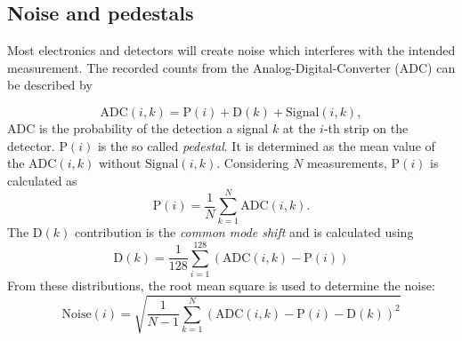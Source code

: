 \subsection{Noise and pedestals}
Most electronics and detectors will create noise which interferes with the intended measurement. The recorded counts from the Analog-Digital-Converter (ADC) can be described by

\begin{equation*}
	\mathrm{ADC}(i,k) = \mathrm{P}(i) + \mathrm{D}(k) + \mathrm{Signal}(i,k),
\end{equation*}
ADC is the probability of the detection a signal $k$ at the $i$-th strip on the detector. $\mathrm{P}(i)$ is the so called \textit{pedestal}. It is determined as the mean value of the $\mathrm{ADC}(i,k)$ without $\mathrm{Signal}(i,k)$. Considering $N$ measurements, $\mathrm{P}(i)$ is calculated as
\begin{equation}
	\mathrm{P}(i) = \frac{1}{N} \sum_{k=1}^{N}\mathrm{ADC}(i,k).
	\label{eq:pedestal}
\end{equation}
The $\mathrm{D}(k)$ contribution is the \textit{common mode shift} and is calculated using 
\begin{equation}
	\mathrm{D}(k) = \frac{1}{128}\sum_{i=1}^{128}(\mathrm{ADC}(i,k) - \mathrm{P}(i))
	\label{eq:common_mode}
\end{equation}
From these distributions, the root mean square is used to determine the noise:
\begin{equation}
	\mathrm{Noise}(i)=\sqrt{\frac{1}{N-1}\sum_{k=1}^{N}(\mathrm{ADC}(i,k) - \mathrm{P}(i) - \mathrm{D}(k))^2}
	\label{eq:noise}
\end{equation}